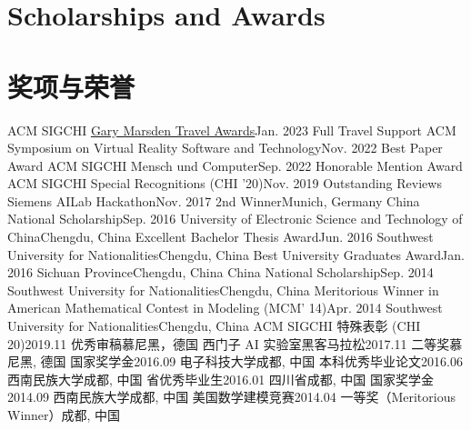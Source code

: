 
 {
\section{\textbf{Scholarships and Awards}}
}{
\section{\textbf{奖项与荣誉}}
}
\resumeSubHeadingListStartNoLabel
{} {
    \resumeSubheading
        {ACM SIGCHI \href{https://sigchi.org/awards/gary-marsden-travel-awards/}{Gary Marsden Travel Awards}}{Jan. 2023}
        {Full Travel Support}{}
    \resumeSubheading
        {ACM Symposium on Virtual Reality Software and Technology}{Nov. 2022}
        {Best Paper Award}{}
    \resumeSubheading
        {ACM SIGCHI Mensch und Computer}{Sep. 2022}
        {Honorable Mention Award}{}
    \resumeSubheading
        {ACM SIGCHI Special Recognitions (CHI '20)}{Nov. 2019}
        {Outstanding Reviews}{}
    \resumeSubheading
        {Siemens AILab Hackathon}{Nov. 2017}
        {2nd Winner}{Munich, Germany}
    \resumeSubheading
        {China National Scholarship}{Sep. 2016}
        {University of Electronic Science and Technology of China}{Chengdu, China}
    \resumeSubheading
        {Excellent Bachelor Thesis Award}{Jun. 2016}
        {Southwest University for Nationalities}{Chengdu, China}
    \resumeSubheading
        {Best University Graduates Award}{Jan. 2016}
        {Sichuan Province}{Chengdu, China}
    \resumeSubheading
        {China National Scholarship}{Sep. 2014}
        {Southwest University for Nationalities}{Chengdu, China}
    \resumeSubheading
        {Meritorious Winner in American Mathematical Contest in Modeling (MCM' 14)}{Apr. 2014}
        {Southwest University for Nationalities}{Chengdu, China}
}{
    \resumeSubheading
        {ACM SIGCHI 特殊表彰 (CHI 20)}{2019.11}
        {优秀审稿}{慕尼黑，德国}
    \resumeSubheading
        {西门子 AI 实验室黑客马拉松}{2017.11}
        {二等奖}{慕尼黑, 德国}
    \resumeSubheading
        {国家奖学金}{2016.09}
        {电子科技大学}{成都, 中国}
    \resumeSubheading
        {本科优秀毕业论文}{2016.06}
        {西南民族大学}{成都, 中国}
    \resumeSubheading
        {省优秀毕业生}{2016.01}
        {四川省}{成都, 中国}
    \resumeSubheading
        {国家奖学金}{2014.09}
        {西南民族大学}{成都, 中国}
    \resumeSubheading
        {美国数学建模竞赛}{2014.04}
        {一等奖（Meritorious Winner）}{成都, 中国}
}
\resumeSubHeadingListEnd